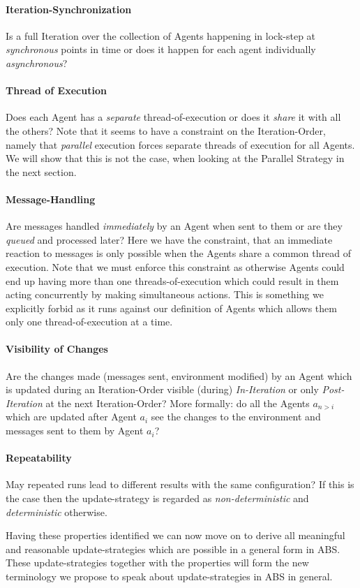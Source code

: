 \paragraph{Iteration-Synchronization}
Is a full Iteration over the collection of Agents happening in lock-step at \textit{synchronous} points in time or does it happen for each agent individually \textit{asynchronous}?

\paragraph{Thread of Execution}
Does each Agent has a \textit{separate} thread-of-execution or does it \textit{share} it with all the others? Note that it seems to have a constraint on the Iteration-Order, namely that \textit{parallel} execution forces separate threads of execution for all Agents. We will show that this is not the case, when looking at the Parallel Strategy in the next section.

\paragraph{Message-Handling}
Are messages handled \textit{immediately} by an Agent when sent to them or are they \textit{queued} and processed later? Here we have the constraint, that an immediate reaction to messages is only possible when the Agents share a common thread of execution. Note that we must enforce this constraint as otherwise Agents could end up having more than one threads-of-execution which could result in them acting concurrently by making simultaneous actions. This is something we explicitly forbid as it runs against our definition of Agents which allows them only one thread-of-execution at a time.

\paragraph{Visibility of Changes}
Are the changes made (messages sent, environment modified) by an Agent which is updated during an Iteration-Order visible (during) \textit{In-Iteration} or only \textit{Post-Iteration} at the next Iteration-Order? More formally: do all the Agents $a_{n>i}$ which are updated after Agent $a_i$ see the changes to the environment and messages sent to them by Agent $a_i$?

\paragraph{Repeatability}
May repeated runs lead to different results with the same configuration? If this is the case then the update-strategy is regarded as \textit{non-deterministic} and \textit{deterministic} otherwise.

Having these properties identified we can now move on to derive all meaningful and reasonable update-strategies which are possible in a general form in ABS. These update-strategies together with the properties will form the new terminology we propose to speak about update-strategies in ABS in general.